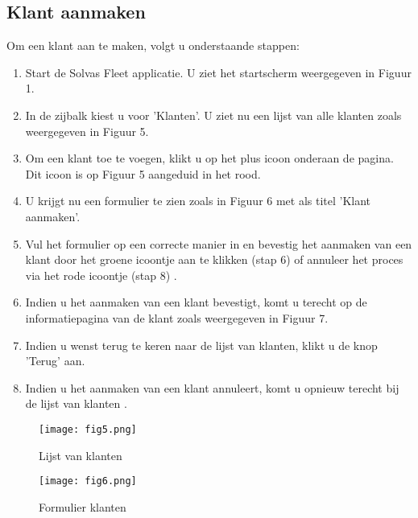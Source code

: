\documentclass[11pt,openany]{article}
\begin{document}
\subsection{Klant aanmaken}
Om een klant aan te maken, volgt u onderstaande stappen:
\begin{enumerate}
	\item Start de Solvas Fleet applicatie. U ziet het startscherm weergegeven in Figuur 1.
	\item In de zijbalk kiest u voor 'Klanten'. U ziet nu een lijst van alle klanten zoals weergegeven in Figuur 5.
	\item Om een klant toe te voegen, klikt u op het plus icoon onderaan de pagina. Dit icoon is op Figuur 5 aangeduid in het rood.
	\item U krijgt nu een formulier te zien zoals in Figuur 6 met als titel 'Klant aanmaken'.
	\item Vul het formulier op een correcte manier in en bevestig het aanmaken van een klant door het groene icoontje aan te klikken (stap 6) of annuleer het proces via het rode icoontje (stap 8) .
	\item Indien u het aanmaken van een klant bevestigt, komt u terecht op de informatiepagina van de klant zoals weergegeven in Figuur 7. 
	\item Indien u wenst terug te keren  naar de lijst van klanten, klikt u de knop 'Terug' aan.
	\item Indien u het aanmaken van een klant annuleert, komt u opnieuw terecht bij de lijst van klanten .
\end{enumerate}
\begin{figure}
	\centering
	\texttt{[image: fig5.png]}
	\caption{Lijst van klanten}
\end{figure}

\begin{figure}
	\centering
	\texttt{[image: fig6.png]}
	\caption{Formulier klanten}
\end{figure}
\newpage
\end{document}
